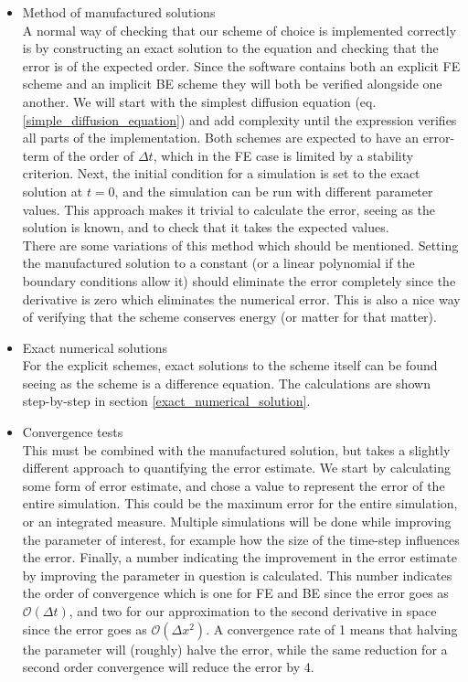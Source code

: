 \begin{itemize}
 \item Method of manufactured solutions\\
 A normal way of checking that our scheme of choice is implemented correctly is by constructing an exact solution to the equation and checking that the error is of the expected order. 
Since the software contains both an explicit FE scheme and an implicit BE scheme they will both be verified alongside one another. 
We will start with the simplest diffusion equation (eq. \eqref{simple_diffusion_equation}) and add complexity until the expression verifies all parts of the implementation. 
Both schemes are expected to have an error-term of the order of $\Delta t$, which in the FE case is limited by a stability criterion. 
Next, the initial condition for a simulation is set to the exact solution at $t=0$, and the simulation can be run with different parameter values. 
This approach makes it trivial to calculate the error, seeing as the solution is known, and to check that it takes the expected values.\\
There are some variations of this method which should be mentioned. 
Setting the manufactured solution to a constant (or a linear polynomial if the boundary conditions allow it) should eliminate the error completely since the derivative is zero which eliminates the numerical error. 
This is also a nice way of verifying that the scheme conserves energy (or matter for that matter).

\item Exact numerical solutions\\
For the explicit schemes, exact solutions to the scheme itself can be found seeing as the scheme is a difference equation. The calculations are shown step-by-step in section \ref{exact_numerical_solution}.
\item Convergence tests\\
This must be combined with the manufactured solution, but takes a slightly different approach to quantifying the error estimate. We start by calculating some form of error estimate, and chose a value to represent the error of the entire simulation. This could be the maximum error for the entire simulation, or an integrated measure. 
Multiple simulations will be done while improving the parameter of interest, for example how the size of the time-step influences the error. 
Finally, a number indicating the improvement in the error estimate by improving the parameter in question is calculated. 
This number indicates the order of convergence which is one for FE and BE since the error goes as $\mathcal{O}(\Delta t)$, and two for our approximation to the second derivative in space since the error goes as $\mathcal O(\Delta x^2)$.
A convergence rate of 1 means that halving the parameter will (roughly) halve the error, while the same reduction for a second order convergence will reduce the error by 4.
\end{itemize}


